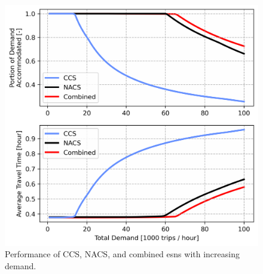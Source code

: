 \begin{figure}[H]
	\centering
	\includegraphics[width = \figurewidth]{./figures/esn_performance.png}
	\caption{Performance of CCS, NACS, and combined \glspl{esn} with increasing demand.}
	\label{fig:esn_performance}
\end{figure}

